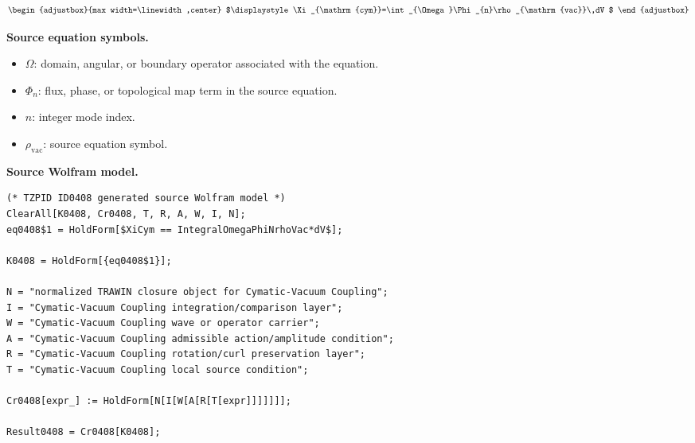 \[
\begin{adjustbox}{max width=\linewidth,center}
$\displaystyle
\Xi_{\mathrm{cym}}=\int_{\Omega}\Phi_{n}\rho_{\mathrm{vac}}\,dV
$
\end{adjustbox}
\]

\begin{minipage}[t]{0.49\linewidth}
\begingroup
\small
\raggedright
\textbf{Source equation symbols.}\par
\begin{itemize}[leftmargin=1.35em,itemsep=1pt,topsep=1pt,parsep=0pt]
    \item $\Omega$: domain, angular, or boundary operator associated with the equation.
    \item $\Phi_{n}$: flux, phase, or topological map term in the source equation.
    \item $n$: integer mode index.
    \item $\rho_{\mathrm{vac}}$: source equation symbol.
\end{itemize}
\endgroup
\end{minipage}\hfill
\begin{minipage}[t]{0.47\linewidth}
\begingroup
\scriptsize
\raggedright
\textbf{Source Wolfram model.}\par
\begin{Verbatim}[fontsize=\tiny,breaklines=true,breakanywhere=true]
(* TZPID ID0408 generated source Wolfram model *)
ClearAll[K0408, Cr0408, T, R, A, W, I, N];
eq0408$1 = HoldForm[$XiCym == IntegralOmegaPhiNrhoVac*dV$];

K0408 = HoldForm[{eq0408$1}];

N = "normalized TRAWIN closure object for Cymatic-Vacuum Coupling";
I = "Cymatic-Vacuum Coupling integration/comparison layer";
W = "Cymatic-Vacuum Coupling wave or operator carrier";
A = "Cymatic-Vacuum Coupling admissible action/amplitude condition";
R = "Cymatic-Vacuum Coupling rotation/curl preservation layer";
T = "Cymatic-Vacuum Coupling local source condition";

Cr0408[expr_] := HoldForm[N[I[W[A[R[T[expr]]]]]]];

Result0408 = Cr0408[K0408];
\end{Verbatim}
\endgroup
\end{minipage}

